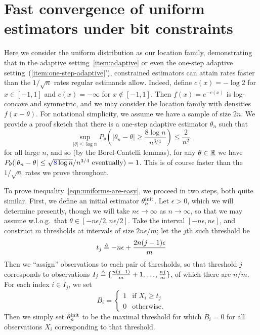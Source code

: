 
\section{Fast convergence of uniform estimators under bit constraints}
\label{sec:uniform-weirdos}

Here we consider the uniform distribution as our location family,
demonstrating that in the adaptive setting~\eqref{item:adaptive} or even the
one-step adaptive setting~(\ref{item:one-step-adaptive}'), constrained
estimators can attain rates faster than the $1 / \sqrt{n}$ rates regular
estimands allow. Indeed, define $c(x) = -\log 2$ for $x \in [-1, 1]$ and
$c(x) = -\infty$ for $x \not \in [-1, 1]$. Then $f(x) = e^{-c(x)}$ is
log-concave and symmetric, and we may consider the location family with
densities $f(x - \theta)$. For notational simplicity, we assume we have
a sample of size $2n$. We provide a proof sketch that
there is a one-step adaptive estimator $\theta_n$ such that
\begin{equation}
  \label{eqn:uniforms-are-easy}
  \sup_{|\theta| \le \log n}
  P_\theta\left(|\theta_n - \theta| \ge \frac{8 \log n}{n^{3/4}}\right)
  \le \frac{2}{n^2}.
\end{equation}
for all large $n$,
and so (by the Borel-Cantelli lemmas), for any $\theta \in \mathbb{R}$ we have
$P_\theta(|\theta_n - \theta| \le \sqrt{{\color{blue} {8}} \log n} / n^{3/4} ~
\mbox{eventually}) = 1$. This is of course faster than the $1/\sqrt{n}$
rates we prove throughout.

To prove inequality~\eqref{eqn:uniforms-are-easy}, we proceed in two steps,
both quite similar.
First, we define an initial estimator $\theta^{\textup{init}}_n$.
Let $\epsilon > 0$, which we will determine presently, though we will
take $n \epsilon \to \infty$ as $n \to \infty$, so that we may assume
w.l.o.g.\ that $\theta \in [-n\epsilon/2, n \epsilon/2]$. Take the interval
$[-n\epsilon, n\epsilon]$, and construct
$m$ thresholds at intervals of size $2 n \epsilon / m$; let
the $j$th such threshold be
\begin{equation*}
  t_j \triangleq -n \epsilon + \frac{2 n (j-1) \epsilon}{m}
\end{equation*}
Then we ``assign'' observations to each pair of thresholds, so that
threshold $j$ corresponds to observations $I_j \triangleq \{\frac{n (j - 1)}{m}
+ 1, \ldots, \frac{n j}{m}\}$, of which there are $n/m$.  For each index $i
\in I_j$, we set
\begin{equation*}
  B_i = \begin{cases}
    1 & \mbox{if~} X_i \ge t_j \\
    0 & \mbox{otherwise}.
  \end{cases}
\end{equation*}
Then we simply set $\theta_n^{\textup{init}}$ to be the maximal threshold for which
$B_i = 0$ for all observations $X_i$ corresponding to that threshold.

